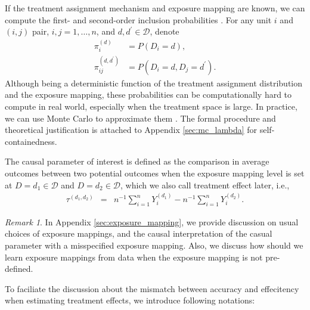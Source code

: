 \documentclass{article}
\theoremstyle{plain}
\theoremstyle{definition}
\theoremstyle{remark}
\newtheorem{remark}[theorem]{Remark}
\newcommand{\cD}{\mathcal{D}}
\newcommand{\sumi}{\sum_{i=1}^n}
\begin{document}
If the treatment assignment mechanism and exposure mapping are known, we can compute the first- and second-order inclusion probabilities \citep{aronow2017estimating}. For any unit $i$ and $(i,j)$ pair, $i,j=1,\ldots,n$, and $d,d^{\prime}\in\cD$, denote
\begin{align}
    \pi_i^{(d)} &= P(D_i = d),\label{eq::prob-d} \\
    \pi_{ij}^{(d,d^{\prime})} &= P(D_i = d, D_j = d^{\prime}). \label{eq::prob-dd}
\end{align}
Although being a deterministic function of the treatment assignment distribution and the exposure mapping, these probabilities can be computationally hard to compute in real world, especially when the treatment space is large. In practice, we can use Monte Carlo to approximate them \citep{aronow2017estimating}. The formal procedure and theoretical justification is attached to Appendix \ref{sec:mc_lambda} for self-containedness. 

The causal parameter of interest is defined as the comparison in average outcomes between two potential outcomes when the exposure mapping level is set at $D=d_1\in\cD$ and $D=d_2\in\cD$, which we also call treatment effect later, i.e.,
\begin{eqnarray*}
    \tau^{(d_1,d_2)} &=& n^{-1}\sumi Y_i^{(d_1)} - n^{-1}\sumi Y_i^{(d_2)}.
\end{eqnarray*}

\begin{remark}
    In Appendix \ref{sec:exposure_mapping}, we provide discussion on usual choices of exposure mappings, and the causal interpretation of the casual parameter with a misspecified exposure mapping. Also, we discuss how should we learn exposure mappings from data when the exposure mapping is not pre-defined. 
\end{remark}
To faciliate the discussion about  the mismatch between accuracy and effecitency when estimating treatment effects, we introduce following notations:
\end{document}
